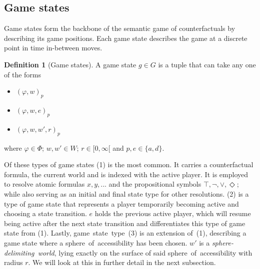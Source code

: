 \documentclass[a4paper,american,10pt]{paper}
\theoremstyle{definition}\newtheorem{lemma}[thm]{Lemma}
\theoremstyle{definition}\newtheorem{proposition}[thm]{Proposition}
\theoremstyle{definition}\newtheorem{corollary}[thm]{Corollary}
\theoremstyle{definition}\newtheorem{definition}{Definition}
\begin{document}
\subsection{Game states}
Game states form the backbone of the semantic game of counterfactuals by describing its game positions. Each game state describes the game at a discrete point in time in-between moves.
\begin{definition}[Game states]
A game state $g\in G$ is a tuple that can take any one of the forms
\begin{itemize}
	\item[(1)] $(\varphi ,w)_p$
	\item[(2)] $(\varphi ,w, e)_p$
	\item[(3)] $(\varphi ,w,w'\!,r)_p$
\end{itemize}
where $\varphi\in\Phi$; $w,w'\in W$; $r\in [0,\infty [$ and $p,e\in\{ a,d\}$.
\end{definition}
\noindent Of these types of game states (1) is the most common. It carries a counterfactual formula, the current world and is indexed with the active player. It is employed to resolve atomic formulas $x,y,...$ and the propositional symbols $\top,\neg,\vee,\Diamond$; while also serving as an initial and final state type for other resolutions. (2) is a type of game state that represents a player temporarily becoming active and choosing a state transition. $e$ holds the previous active player, which will resume being active after the next state transition and differentiates this type of game state from (1). Lastly, game~state~type~(3) is an extension of~(1), describing a game state where a sphere~of~accessibility has been chosen. $w'$ is a \textit{sphere-delimiting~world}, lying exactly on the surface of said sphere~of~accessibility with radius $r$. We will look at this in further detail in the next subsection.
\end{document}
